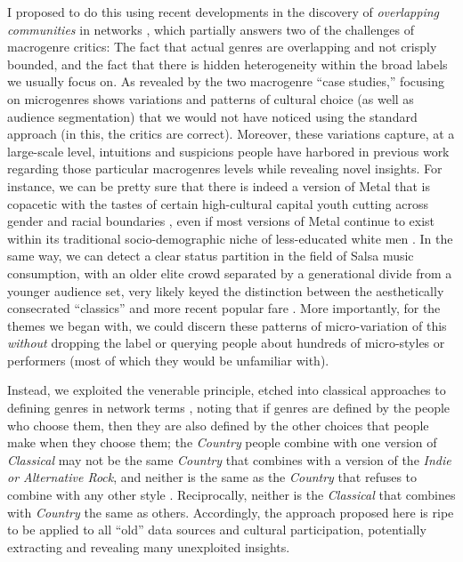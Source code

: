 \documentclass[a4paper,12pt]{extarticle}
\begin{document}
I proposed to do this using recent developments in the discovery of \textit{overlapping communities} in networks \citep{ahn_etal10}, which partially answers two of the challenges of macrogenre critics: The fact that actual genres are overlapping and not crisply bounded, and the fact that there is hidden heterogeneity within the broad labels we usually focus on. As revealed by the two macrogenre ``case studies,'' focusing on microgenres shows variations and patterns of cultural choice (as well as audience segmentation) that we would not have noticed using the standard approach (in this, the critics are correct). Moreover, these variations capture, at a large-scale level, intuitions and suspicions people have harbored in previous work regarding those particular macrogenres levels while revealing novel insights. For instance, we can be pretty sure that there is indeed a version of Metal that is copacetic with the tastes of certain high-cultural capital youth cutting across gender and racial boundaries \citep{tampubolon2008revisiting}, even if most versions of Metal continue to exist within its traditional socio-demographic niche of less-educated white men \citep{bryson96}. In the same way, we can detect a clear status partition in the field of Salsa music consumption, with an older elite crowd separated by a generational divide from a younger audience set, very likely keyed the distinction between the aesthetically consecrated ``classics'' and more recent popular fare \citep{Bachmayer2014-pk}. More importantly, for the themes we began with, we could discern these patterns of micro-variation of this \textit{without} dropping the label or querying people about hundreds of micro-styles or performers (most of which they would be unfamiliar with). 

Instead, we exploited the venerable principle, etched into classical approaches to defining genres in network terms \citep{dimaggio1987classification}, noting that if genres are defined by the people who choose them, then they are also defined by the other choices that people make when they choose them; the \textit{Country} people combine with one version of \textit{Classical} may not be the same \textit{Country} that combines with a version of the \textit{Indie or Alternative Rock}, and neither is the same as the \textit{Country} that refuses to combine with any other style \citep{lembo2017three}. Reciprocally, neither is the \textit{Classical} that combines with \textit{Country} the same as others. Accordingly, the approach proposed here is ripe to be applied to all ``old'' data sources and cultural participation, potentially extracting and revealing many unexploited insights. 
\end{document}
